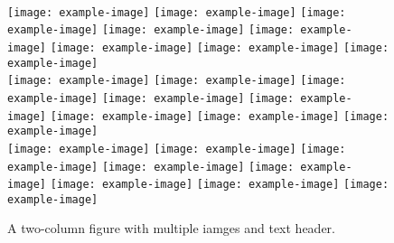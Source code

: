 \begin{figure*}[t] \centering
    \\
    \texttt{[image: example-image]}
    \texttt{[image: example-image]}
    \texttt{[image: example-image]}
    \texttt{[image: example-image]}
    \texttt{[image: example-image]}
    \texttt{[image: example-image]}
    \texttt{[image: example-image]}
    \texttt{[image: example-image]}
    \\
    \texttt{[image: example-image]}
    \texttt{[image: example-image]}
    \texttt{[image: example-image]}
    \texttt{[image: example-image]}
    \texttt{[image: example-image]}
    \texttt{[image: example-image]}
    \texttt{[image: example-image]}
    \texttt{[image: example-image]}
    \\
    \texttt{[image: example-image]}
    \texttt{[image: example-image]}
    \texttt{[image: example-image]}
    \texttt{[image: example-image]}
    \texttt{[image: example-image]}
    \texttt{[image: example-image]}
    \texttt{[image: example-image]}
    \texttt{[image: example-image]}
    \\
    \caption{A two-column figure with multiple iamges and text header.} 
    \label{fig:figure8}
\end{figure*}
